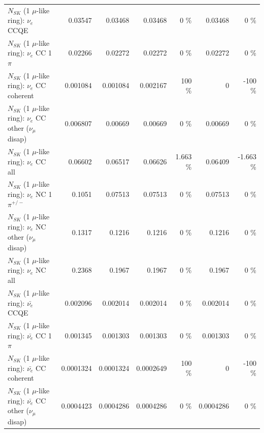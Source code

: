 \begin{table}
\begin{tabular}{| l | r | r | r  r | r  r |}
\hline
\hline
\hline
                                      $N_{SK}$ (1 $\mu$-like ring): $\nu_e$ CCQE &         0.03547 &         0.03468 &         0.03468 &        0 \%  &         0.03468 &        0 \%  \\ 
                                 $N_{SK}$ (1 $\mu$-like ring): $\nu_e$ CC 1$\pi$ &         0.02266 &         0.02272 &         0.02272 &        0 \%  &         0.02272 &        0 \%  \\ 
                               $N_{SK}$ (1 $\mu$-like ring): $\nu_e$ CC coherent &        0.001084 &        0.001084 &        0.002167 &      100 \%  &               0 &     -100 \%  \\ 
                $N_{SK}$ (1 $\mu$-like ring): $\nu_e$ CC other ($\nu_\mu$ disap) &        0.006807 &         0.00669 &         0.00669 &        0 \%  &         0.00669 &        0 \%  \\ 
                                  $N_{SK}$ (1 $\mu$-like ring): $\nu_{e}$ CC all &         0.06602 &         0.06517 &         0.06626 &    1.663 \%  &         0.06409 &   -1.663 \%  \\ 
\hline
                           $N_{SK}$ (1 $\mu$-like ring): $\nu_e$ NC 1$\pi^{+/-}$ &          0.1051 &         0.07513 &         0.07513 &        0 \%  &         0.07513 &        0 \%  \\ 
                $N_{SK}$ (1 $\mu$-like ring): $\nu_e$ NC other ($\nu_\mu$ disap) &          0.1317 &          0.1216 &          0.1216 &        0 \%  &          0.1216 &        0 \%  \\ 
                                  $N_{SK}$ (1 $\mu$-like ring): $\nu_{e}$ NC all &          0.2368 &          0.1967 &          0.1967 &        0 \%  &          0.1967 &        0 \%  \\ 
\hline
\hline
\hline
                                $N_{SK}$ (1 $\mu$-like ring): $\bar{\nu_e}$ CCQE &        0.002096 &        0.002014 &        0.002014 &        0 \%  &        0.002014 &        0 \%  \\ 
                           $N_{SK}$ (1 $\mu$-like ring): $\bar{\nu_e}$ CC 1$\pi$ &        0.001345 &        0.001303 &        0.001303 &        0 \%  &        0.001303 &        0 \%  \\ 
                         $N_{SK}$ (1 $\mu$-like ring): $\bar{\nu_e}$ CC coherent &       0.0001324 &       0.0001324 &       0.0002649 &      100 \%  &               0 &     -100 \%  \\ 
          $N_{SK}$ (1 $\mu$-like ring): $\bar{\nu_e}$ CC other ($\nu_\mu$ disap) &       0.0004423 &       0.0004286 &       0.0004286 &        0 \%  &       0.0004286 &        0 \%  \\ 

\end{tabular}
\end{table}
